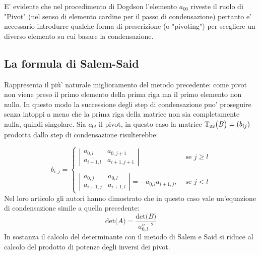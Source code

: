 \documentclass{article}
\begin{document}
E' evidente che nel procedimento di Dogdson l'elemento $a_{00}$ riveste il ruolo di "Pivot" (nel senso di elemento cardine per il passo di condensazione) pertanto e' necessario introdurre qualche forma di prescrizione (o "pivoting") per scegliere un diverso elemento su cui basare la condensazione.

\subsection{La formula di Salem-Said}
Rappresenta il più' naturale miglioramento del metodo precedente: come pivot non viene preso il primo elemento della prima riga ma il primo elemento non nullo. In questo modo la successione degli step di condensazione puo' proseguire senza intoppi a meno che la prima riga della matrice non sia completamente nulla, quindi singolare.
\newline
Sia $a_{0l}$ il pivot, in questo caso la matrice $ \mbox{T}_{\mbox{\tiny SS}}\big(B\big)=(b_{ij})$ prodotta dallo step di condensazione risulterebbe:

	\begin{equation}
		b_{i,j}= 
		\begin{cases} 
			\left| \begin{array}{cc} a_{0,l} & a_{0,j+1}  \\ a_{i+1 , l} & a_{i+1 , j+1}  \end{array} \right| & \mbox{ se } j \geq l \\ 
			 & \\
			\left| \begin{array}{cc} a_{0,j} & a_{0,l}  \\ a_{i+1 , j} & a_{i+1 , l}  \end{array} \right| = -a_{0,l} a_{i+1 , j}, & \mbox{ se } j<l
		\end{cases}
	\end{equation}
Nel loro articolo \cite{arx:SalemSaid} gli autori hanno dimostrato che in questo caso vale un'equazione di condensazione simile a quella precedente:
	\begin{equation}
		 \mbox{det}\big(A\big) = \dfrac{\mbox{det}\big(B\big)}{a_{0,l}^{n-2}}
	\end{equation}\label{Det:SS}
In sostanza il calcolo del determinante con il metodo di Salem e Said si riduce al calcolo del prodotto di potenze degli inversi dei pivot.
\end{document}
